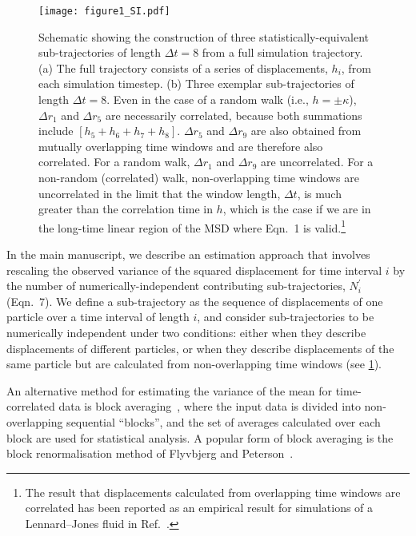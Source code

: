 \documentclass[reprint,superscriptaddress,nobibnotes,amsmath,amssymb,aps,prx,hidelinks]{revtex4-2}
\newcommand{\nind}[1]{\ensuremath{N^\prime_{#1}}}
\begin{document}
\begin{figure}[tb]
  \centering
  \texttt{[image: figure1\_SI.pdf]} 
    \caption{\label{fig:displacements}Schematic showing the construction of three statistically-equivalent sub-trajectories of length $\Delta t = 8$ from a full simulation trajectory. (a) The full trajectory consists of a series of displacements, $h_i$, from each simulation timestep. (b) Three exemplar sub-trajectories of length $\Delta t = 8$. Even in the case of a random walk (i.e., $h=\pm\kappa$), $\Delta r_1$ and $\Delta r_5$ are necessarily correlated, because both summations include $[h_5 + h_6 + h_7 + h_8]$. $\Delta r_5$ and $\Delta r_9$ are also obtained from mutually overlapping time windows and are therefore also correlated. For a random walk, $\Delta r_1$ and $\Delta r_9$ are uncorrelated. For a non-random (correlated) walk, non-overlapping time windows are uncorrelated in the limit that the window length, $\Delta t$, is much greater than the correlation time in $h$, which is the case if we are in the long-time linear region of the MSD where Eqn.~1 is valid.\footnote{The result that displacements calculated from overlapping time windows are correlated has been reported as an empirical result for simulations of a Lennard--Jones fluid in Ref.~.}} 
\end{figure}

In the main manuscript, we describe an estimation approach that involves rescaling the observed variance of the squared displacement for time interval $i$ by the number of numerically-independent contributing sub-trajectories, $\nind{i}$ (Eqn.~7). 
We define a sub-trajectory as the sequence of displacements of one particle over a time interval of length $i$, and consider sub-trajectories to be numerically independent under two conditions: either when they describe displacements of different particles, or when they describe displacements of the same particle but are calculated from non-overlapping time windows (see \cref{fig:displacements}).

An alternative method for estimating the variance of the mean for time-correlated data is block averaging~\cite{Frenkel2023-ah}, where the input data is divided into non-overlapping sequential ``blocks'', and the set of averages calculated over each block are used for statistical analysis.
A popular form of block averaging is the block renormalisation method of Flyvbjerg and Peterson~\cite{FlyvbjergAndPetersen_JChemPhys1989}.
\end{document}
